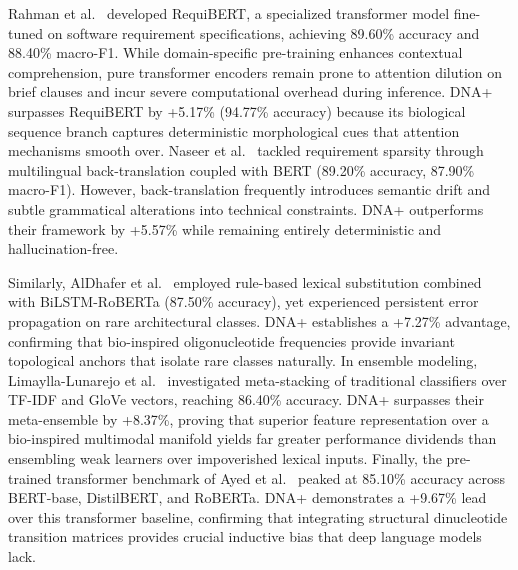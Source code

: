 Rahman et al.~\cite{ref26} developed RequiBERT, a specialized transformer model fine-tuned on software requirement specifications, achieving 89.60\% accuracy and 88.40\% macro-F1. While domain-specific pre-training enhances contextual comprehension, pure transformer encoders remain prone to attention dilution on brief clauses and incur severe computational overhead during inference. DNA+ surpasses RequiBERT by +5.17\% (94.77\% accuracy) because its biological sequence branch captures deterministic morphological cues that attention mechanisms smooth over. Naseer et al.~\cite{ref27} tackled requirement sparsity through multilingual back-translation coupled with BERT (89.20\% accuracy, 87.90\% macro-F1). However, back-translation frequently introduces semantic drift and subtle grammatical alterations into technical constraints. DNA+ outperforms their framework by +5.57\% while remaining entirely deterministic and hallucination-free.

Similarly, AlDhafer et al.~\cite{ref28} employed rule-based lexical substitution combined with BiLSTM-RoBERTa (87.50\% accuracy), yet experienced persistent error propagation on rare architectural classes. DNA+ establishes a +7.27\% advantage, confirming that bio-inspired oligonucleotide frequencies provide invariant topological anchors that isolate rare classes naturally. In ensemble modeling, Limaylla-Lunarejo et al.~\cite{ref29} investigated meta-stacking of traditional classifiers over TF-IDF and GloVe vectors, reaching 86.40\% accuracy. DNA+ surpasses their meta-ensemble by +8.37\%, proving that superior feature representation over a bio-inspired multimodal manifold yields far greater performance dividends than ensembling weak learners over impoverished lexical inputs. Finally, the pre-trained transformer benchmark of Ayed et al.~\cite{ref30} peaked at 85.10\% accuracy across BERT-base, DistilBERT, and RoBERTa. DNA+ demonstrates a +9.67\% lead over this transformer baseline, confirming that integrating structural dinucleotide transition matrices provides crucial inductive bias that deep language models lack.

